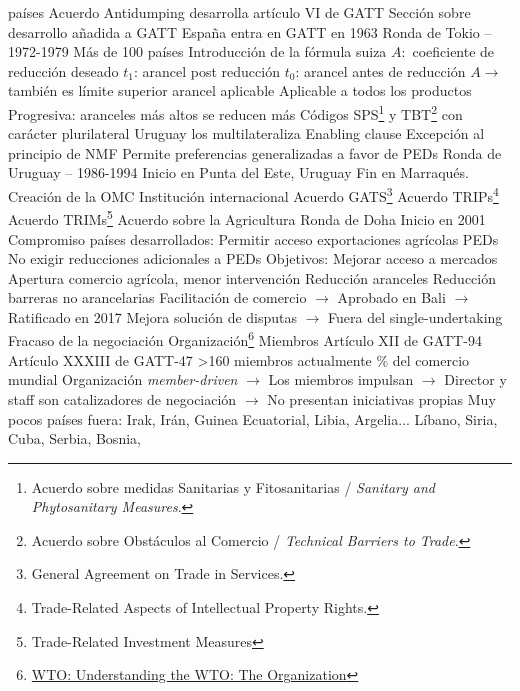 \documentclass{nuevotema}
\begin{document}
\begin{esquemal}
				 países
				\4 Acuerdo Antidumping desarrolla artículo VI de GATT
				\4 Sección sobre desarrollo añadida a GATT
				\4 España entra en GATT en 1963
			\3 Ronda de Tokio -- 1972-1979
				\4 Más de 100 países
				\4 Introducción de la fórmula suiza
				\4[] 
				\4[] $A:$ coeficiente de reducción deseado
				\4[] $t_1$: arancel post reducción
				\4[] $t_0$:  arancel antes de reducción
				\4[] $A \to$ también es límite superior arancel aplicable
				\4[] Aplicable a todos los productos
				\4[] Progresiva: aranceles más altos se reducen más
				\4 Códigos SPS\footnote{Acuerdo sobre medidas Sanitarias y Fitosanitarias / \textit{Sanitary and Phytosanitary Measures}.} y TBT\footnote{Acuerdo sobre Obstáculos al Comercio / \textit{Technical Barriers to Trade}.}
				\4[] con carácter plurilateral
				\4[] Uruguay los multilateraliza
				\4 Enabling clause
				\4[] Excepción al principio de NMF
				\4[] Permite preferencias generalizadas a favor de PEDs
			\3 Ronda de Uruguay -- 1986-1994
				\4 Inicio en Punta del Este, Uruguay
				\4[] Fin en Marraqués.
				\4 Creación de la OMC
				\4[] Institución internacional
				\4 Acuerdo GATS\footnote{General Agreement on Trade in Services.}
				\4 Acuerdo TRIPs\footnote{Trade-Related Aspects of Intellectual Property Rights.}
				\4 Acuerdo TRIMs\footnote{Trade-Related Investment Measures}
				\4 Acuerdo sobre la Agricultura
			\3 Ronda de Doha
				\4 Inicio en 2001
				\4 Compromiso países desarrollados:
				\4[] Permitir acceso exportaciones agrícolas PEDs
				\4[] No exigir reducciones adicionales a PEDs
				\4 Objetivos:
				\4[] Mejorar acceso a mercados
				\4[] Apertura comercio agrícola, menor intervención
				\4[] Reducción aranceles
				\4[] Reducción barreras no arancelarias
				\4[] Facilitación de comercio $\to$ Aprobado en Bali
				\4[] $\to$ Ratificado en 2017
				\4 Mejora solución de disputas
				\4[] $\to$ Fuera del single-undertaking
				\4 Fracaso de la negociación
		\2 Organización\footnote{\href{https://www.wto.org/english/thewto_e/whatis_e/tif_e/org1_e.htm}{WTO: Understanding the WTO: The Organization}}
			\3 Miembros
				\4 Artículo XII de GATT-94
				\4[] Artículo XXXIII de GATT-47
				\4 >160 miembros actualmente
				\% del comercio mundial
				\4 Organización \textit{member-driven}
				\4[] $\to$ Los miembros impulsan
				\4[] $\to$ Director y staff son catalizadores de negociación
				\4[] $\to$ No presentan iniciativas propias
				\4 Muy pocos países fuera:
				\4[] Irak, Irán, Guinea Ecuatorial, Libia, Argelia...
				\4[] Líbano, Siria, Cuba, Serbia, Bosnia,

\end{esquemal}
\end{document}

